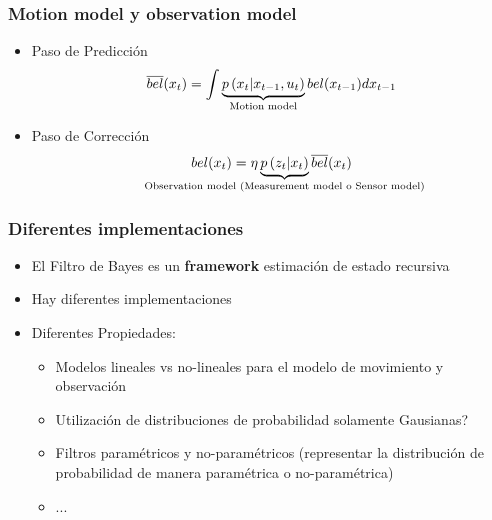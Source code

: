 \begin{frame}
  \frametitle{Motion model y observation model}
    \begin{itemize}
         \item Paso de Predicción
        \begin{equation*}
            \overline{bel}(x_{t}) = \int \underbrace{p\left(x_{t} | x_{t-1}, u_{t} \right)}_{\text{Motion model}} bel(x_{t-1}) d x_{t-1}
        \end{equation*}
        \item Paso de Corrección
        \begin{equation*}
            bel(\state_{t}) = \eta \underbrace{p\left(\observation_{t} |\state_{t} \right)}_{\text{\makebox[0pt]{Observation model (Measurement model o Sensor model)}}} \overline{bel}(\state_{t})
        \end{equation*}
    \end{itemize}
    
    
\end{frame}

\begin{frame}
  \frametitle{Diferentes implementaciones}
    \begin{itemize}
        \item El Filtro de Bayes es un {\bf framework} estimación de estado recursiva
        \item Hay diferentes implementaciones
        \item Diferentes Propiedades:
        \begin{itemize}
            \item Modelos lineales vs no-lineales para el modelo de movimiento y observación
            \item Utilización de distribuciones de probabilidad solamente Gausianas? 
            \item Filtros paramétricos y no-paramétricos (representar la distribución de probabilidad de manera paramétrica o no-paramétrica)
            \item ...
        \end{itemize}
    \end{itemize}
    
\end{frame}

